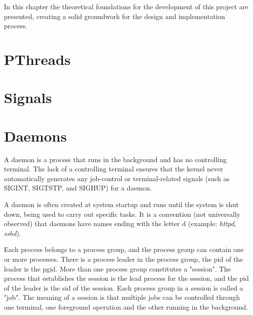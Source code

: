 In this chapter the theoretical foundations for the development of this project are presented, creating a solid groundwork for the design and implementation process.

\section{PThreads}
\section{Signals}



\clearpage
\section{Daemons}
A daemon is a process that runs in the background and has no controlling terminal. The lack of a controlling terminal ensures that the kernel never automatically generates any job-control or terminal-related signals (such as SIGINT, SIGTSTP, and SIGHUP) for a daemon. \cite{linux_progr_interface}

A daemon is often created at system startup and runs until the system is shut down, being used to carry out specific tasks. It is a convention (not universally observed) that daemons have names ending with the letter d (example: \textit{httpd}, \textit{sshd}). 

Each process belongs to a process group, and the process group can contain one or more processes. There is a process leader in the process group, the \ac{pid} of the leader is the \ac{pgid}. More than one process group constitutes a "session". The process that establishes the session is the lead process for the session, and the \ac{pid} of the leader is the \ac{sid} of the session. Each process group in a session is called a "job". The meaning of a session is that multiple jobs can be controlled through one terminal, one foreground operation and the other running in the background. \cite{daemons}\newline

